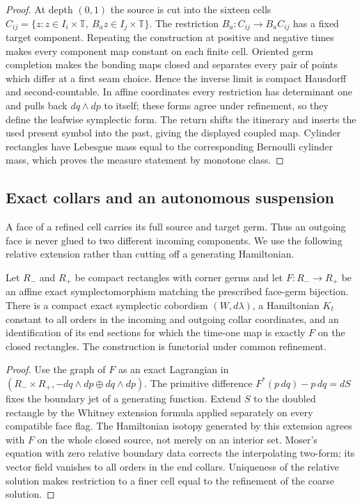 \begin{proof}
At depth $(0,1)$ the source is cut into the sixteen cells
$C_{ij}=\{z:z\in I_i\times\mathbb T,\ B_az\in I_j\times\mathbb T\}$.
The restriction $B_a:C_{ij}\to B_aC_{ij}$ has a fixed target component.
Repeating the construction at positive and negative times makes every
component map constant on each finite cell.  Oriented germ completion makes
the bonding maps closed and separates every pair of points which differ at a
first seam choice.  Hence the inverse limit is compact Hausdorff and
second-countable.  In affine coordinates every restriction has determinant
one and pulls back $dq\wedge dp$ to itself; these forms agree under refinement,
so they define the leafwise symplectic form.  The return shifts the itinerary
and inserts the used present symbol into the past, giving the displayed
coupled map.  Cylinder rectangles have Lebesgue mass equal to the corresponding
Bernoulli cylinder mass, which proves the measure statement by monotone class.
\end{proof}

\subsection{Exact collars and an autonomous suspension}

A face of a refined cell carries its full source and target germ.  Thus an
outgoing face is never glued to two different incoming components.  We use the
following relative extension rather than cutting off a generating Hamiltonian.

\begin{lemma}
\label{lem:r12-a1-collar}
Let $R_-$ and $R_+$ be compact rectangles with corner germs and let
$F:R_-\to R_+$ be an affine exact symplectomorphism matching the prescribed
face-germ bijection.  There is a compact exact symplectic cobordism
$(W,d\lambda)$, a Hamiltonian $K_t$ constant to all orders in the incoming and
outgoing collar coordinates, and an identification of its end sections for
which the time-one map is exactly $F$ on the closed rectangles.  The
construction is functorial under common refinement.
\end{lemma}

\begin{proof}
Use the graph of $F$ as an exact Lagrangian in
$(R_-\times R_+, -dq\wedge dp\oplus dq\wedge dp)$.  The primitive difference
$F^*(p\,dq)-p\,dq=dS$ fixes the boundary jet of a generating function.  Extend
$S$ to the doubled rectangle by the Whitney extension formula applied
separately on every compatible face flag.  The Hamiltonian isotopy generated
by this extension agrees with $F$ on the whole closed source, not merely on an
interior set.  Moser's equation with zero relative boundary data corrects the
interpolating two-form; its vector field vanishes to all orders in the end
collars.  Uniqueness of the relative solution makes restriction to a finer
cell equal to the refinement of the coarse solution.
\end{proof}

